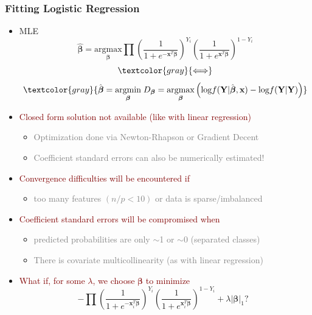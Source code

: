 \documentclass[xcolor={dvipsnames}]{beamer}
\begin{document}
\frame
{
\frametitle{Fitting Logistic Regression}

\begin{itemize}
\item MLE
$$\hat {\boldsymbol \beta} = \underset{{\boldsymbol \beta}}{\text{argmax}} \prod \left(\frac{1}{1+e^{-\boldsymbol x^T \boldsymbol \beta}}\right)^{Y_i} \left(\frac{1}{1+e^{\boldsymbol x^T \boldsymbol \beta}}\right)^{1-Y_i}$$
$$ \textcolor{gray}{\Longleftrightarrow}$$
$$ \textcolor{gray}{\hat {\boldsymbol \beta} = \underset{{\boldsymbol \beta}}{\text{argmin}} \; D_{\boldsymbol \beta} = \underset{{\boldsymbol \beta}}{\text{argmax}} \left( \text{log}f(\textbf{Y}|\hat {\boldsymbol \beta}, \textbf{x}) - \text{log}f(\textbf{Y}|\textbf{Y})\right)}$$


\item \textcolor{Maroon}{Closed form solution not available (like with linear regression)}
\begin{itemize}
\item  \textcolor{gray}{Optimization done via Newton-Rhapson or Gradient Decent}
\item \textcolor{gray}{Coefficient standard errors can also be numerically estimated!}
\end{itemize}

\item \textcolor{Maroon}{Convergence difficulties will be encountered if} 
\begin{itemize}
\item \textcolor{gray}{too many features $(n/p < 10)$ or data is sparse/imbalanced} 
\end{itemize}

\item \textcolor{Maroon}{Coefficient standard errors will be compromised when} 
\begin{itemize}
\item \textcolor{gray}{predicted probabilities are only $\sim$1 or $\sim$0 (separated classes)}
\item \textcolor{gray}{There is covariate multicollinearity (as with linear regression)}
\end{itemize}

\item  \textcolor{Maroon}{What if, for some $\lambda$,  we choose $\boldsymbol \beta$ to minimize} 
$$ -\prod \left(\frac{1}{1+e^{-\textbf{x}^T_i{\boldsymbol \beta}}}\right)^{Y_i} \left(\frac{1}{1+e^{\textbf{x}^T_i{\boldsymbol \beta}}}\right)^{1-Y_i} + \lambda | {\boldsymbol \beta}|_1? \;\;$$

\end{itemize}





}
\end{document}
